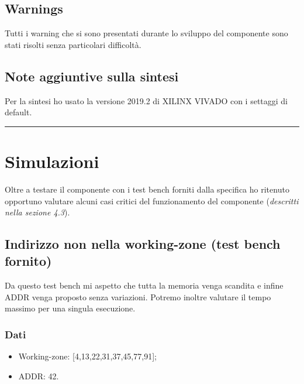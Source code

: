 \documentclass{article}
\begin{document}
\subsection{Warnings}
Tutti i warning che si sono presentati durante lo sviluppo del componente sono stati risolti senza particolari difficoltà.
\subsection{Note aggiuntive sulla sintesi}
Per la sintesi ho usato la versione 2019.2 di XILINX VIVADO con i settaggi di default.

\noindent\rule{\textwidth}{0.5pt}
\newpage
\section{Simulazioni}
Oltre a testare il componente con i test bench forniti dalla specifica ho ritenuto opportuno valutare alcuni casi critici del funzionamento del componente (\textit{descritti nella sezione 4.3}).
\subsection{Indirizzo non nella working-zone (test bench fornito)}
Da questo test bench mi aspetto che tutta la memoria venga scandita e infine ADDR venga proposto senza variazioni.
Potremo inoltre valutare il tempo massimo per una singula esecuzione.
\subsubsection{Dati}
\begin{itemize}
	\item Working-zone: [4,13,22,31,37,45,77,91];
	\item ADDR: 42.
\end{itemize}
\end{document}
